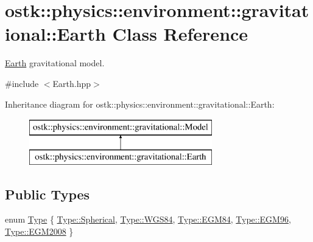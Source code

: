\hypertarget{classostk_1_1physics_1_1environment_1_1gravitational_1_1_earth}{}\section{ostk\+:\+:physics\+:\+:environment\+:\+:gravitational\+:\+:Earth Class Reference}
\label{classostk_1_1physics_1_1environment_1_1gravitational_1_1_earth}


\hyperlink{classostk_1_1physics_1_1environment_1_1gravitational_1_1_earth}{Earth} gravitational model.  




{\ttfamily \#include $<$Earth.\+hpp$>$}

Inheritance diagram for ostk\+:\+:physics\+:\+:environment\+:\+:gravitational\+:\+:Earth\+:\begin{figure}[H]
\begin{center}
\leavevmode
\includegraphics[height=2.000000cm]{classostk_1_1physics_1_1environment_1_1gravitational_1_1_earth}
\end{center}
\end{figure}
\subsection*{Public Types}
\begin{DoxyCompactItemize}
\item 
enum \hyperlink{classostk_1_1physics_1_1environment_1_1gravitational_1_1_earth_a9895df78b5c5aab5e981bf765f8c0f05}{Type} \{ \newline
\hyperlink{classostk_1_1physics_1_1environment_1_1gravitational_1_1_earth_a9895df78b5c5aab5e981bf765f8c0f05a24e5c24fabd1c081d4c729094df0b947}{Type\+::\+Spherical}, 
\hyperlink{classostk_1_1physics_1_1environment_1_1gravitational_1_1_earth_a9895df78b5c5aab5e981bf765f8c0f05a5dda43a21474cf33e7088b8247f19c4b}{Type\+::\+W\+G\+S84}, 
\hyperlink{classostk_1_1physics_1_1environment_1_1gravitational_1_1_earth_a9895df78b5c5aab5e981bf765f8c0f05a2ae5659e79a4bb66ae4ee8cb033ef196}{Type\+::\+E\+G\+M84}, 
\hyperlink{classostk_1_1physics_1_1environment_1_1gravitational_1_1_earth_a9895df78b5c5aab5e981bf765f8c0f05a7c7ad846cb98dafc9309087d3ba36013}{Type\+::\+E\+G\+M96}, 
\newline
\hyperlink{classostk_1_1physics_1_1environment_1_1gravitational_1_1_earth_a9895df78b5c5aab5e981bf765f8c0f05af22fbbe07f6feeaa3d6446dabcd8b164}{Type\+::\+E\+G\+M2008}
 \}
\end{DoxyCompactItemize}
